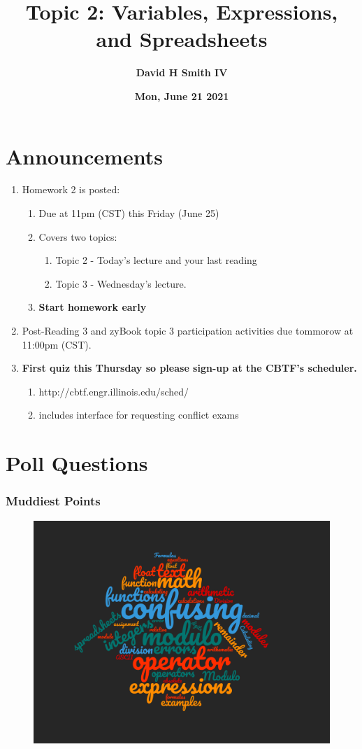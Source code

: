 \documentclass{beamer}
\title{\textbf{Topic 2: Variables, Expressions, and Spreadsheets}}
\author{\textbf{David H Smith IV}}
\institute[\textbf{UIUC}]{\textbf{University of Illinois Urbana-Champaign}}
\date{\textbf{Mon, June 21 2021}}
\begin{document}
\frame{\titlepage}

\section{Announcements}

\begin{frame}
  \begin{enumerate}
    \item Homework 2 is posted:
      \begin{enumerate}
        \item Due at 11pm (CST) this Friday (June 25)
        \item Covers two topics:
          \begin{enumerate}
            \item Topic 2 - Today's lecture and your last reading
            \item Topic 3 - Wednesday's lecture. 
          \end{enumerate}
        \item \textbf{Start homework early}
      \end{enumerate}
    \item Post-Reading 3 and zyBook topic 3 participation activities due tommorow at 11:00pm (CST).
    \item \textbf{First quiz this Thursday so please sign-up at the CBTF's scheduler.}
      \begin{enumerate}
        \item http://cbtf.engr.illinois.edu/sched/
        \item includes interface for requesting conflict exams
      \end{enumerate}
  \end{enumerate}
\end{frame}

\section{Poll Questions}

%
%
%
\begin{frame}[fragile]
  \frametitle{Muddiest Points}
  \begin{figure}
    \centering
    \includegraphics[width=.75\textwidth]{./imgs/muddiest-points-cloud-topic-2.png}
  \end{figure}
\end{frame}
\end{document}
